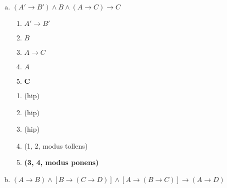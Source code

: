 \documentclass[a4paper, 12pt, addpoints]{exam}
\begin{document}
\begin{questions}
\begin{resp}
\begin{enumerate}[a)]
\begin{multicols}{2}
        \columnbreak

        \begin{enumerate}[\ding{32}]
          \item (hip)
          \item (hip)
          \item (hip)
          \item (hip da conclusão)
          \item (2, 4, silogismo disjuntivo)
          \item (1, 5, modus ponens)
          \item \textbf{(3, 6, modus ponens)}
        \end{enumerate}

      \end{multicols}
      
      \item $(A' \rightarrow B') \wedge B \wedge (A \rightarrow C) \rightarrow C$ \\
      \begin{multicols}{2}

        \begin{enumerate}[1.]
          \item $A' \rightarrow B'$
          \item $B$
          \item $A \rightarrow C$
          \item $A$
          \item $\boldsymbol{C}$
        \end{enumerate}
        
        \columnbreak

        \begin{enumerate}[\ding{32}]
          \item (hip)
          \item (hip)
          \item (hip)
          \item (1, 2, modus tollens)
          \item \textbf{(3, 4, modus ponens)} 
        \end{enumerate}

      \end{multicols}

      \item $(A \rightarrow B) \wedge [B \rightarrow (C \rightarrow D)] \wedge [A \rightarrow (B \rightarrow C)] \rightarrow (A \rightarrow D)$ \\
      \begin{multicols}{2}


\end{multicols}
\end{enumerate}
\end{resp}
\end{questions}
\end{document}
